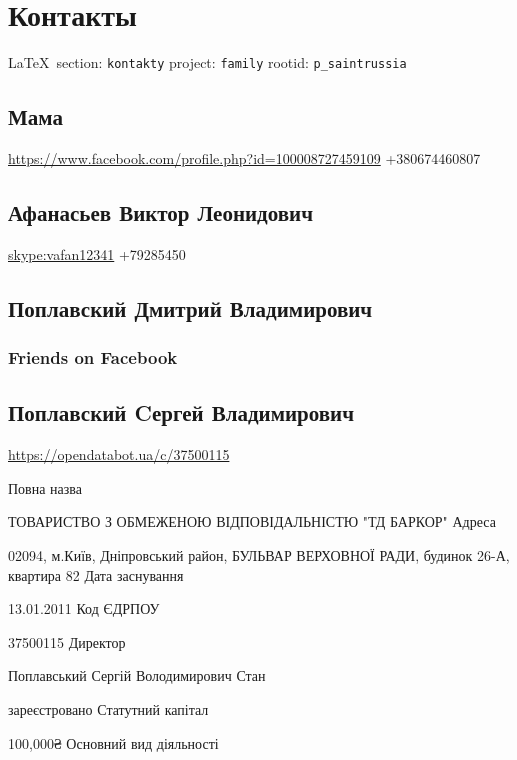  
 
\section{Контакты}

\vspace{0.5cm}
 {\ifDEBUG\small\LaTeX~section: \verb|kontakty| project: \verb|family| rootid: \verb|p_saintrussia| \fi}
\vspace{0.5cm}

\subsection{Мама}
\url{https://www.facebook.com/profile.php?id=100008727459109}
+380674460807

\subsection{Афанасьев Виктор Леонидович}
\url{skype:vafan12341}
+79285450

\subsection{Поплавский Дмитрий Владимирович}

\subsubsection{Friends on Facebook}

\subsection{Поплавский Cергей Владимирович}

\url{https://opendatabot.ua/c/37500115}

Повна назва

ТОВАРИСТВО З ОБМЕЖЕНОЮ ВІДПОВІДАЛЬНІСТЮ "ТД БАРКОР"
Адреса

02094, м.Київ, Дніпровський район, БУЛЬВАР ВЕРХОВНОЇ РАДИ, будинок 26-А, квартира 82
Дата заснування

13.01.2011
Код ЄДРПОУ

37500115
Директор

Поплавський Сергій Володимирович
Стан

зареєстровано
Статутний капітал

100,000₴
Основний вид діяльності

